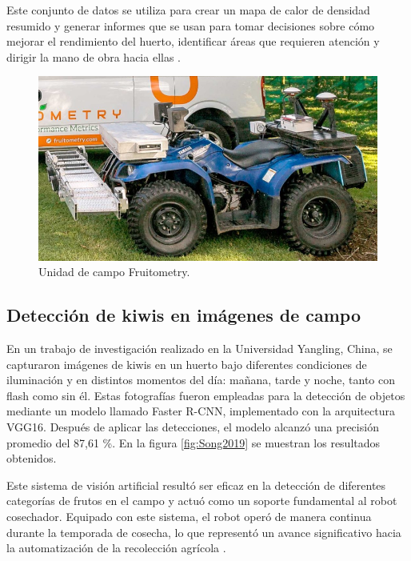 Este conjunto de datos se utiliza para crear un mapa de calor de densidad resumido y generar informes que se usan para tomar decisiones sobre cómo mejorar el rendimiento del huerto, identificar áreas que requieren atención y dirigir la mano de obra hacia ellas \citep{WEBSITE:Fruitometry2024}.

\vspace{1cm}
\begin{figure}[htbp]
	\centering
	\includegraphics[width=.5\textwidth]{./Figures/Fruitometry.png}
	\caption{Unidad de campo Fruitometry\protect\footnotemark.}
	\label{fig:Fruitometry}
\end{figure}
\vspace{1cm}


\subsection{Detección de kiwis en imágenes de campo}

En un trabajo de investigación realizado en la Universidad Yangling, China, se capturaron imágenes de kiwis en un huerto bajo diferentes condiciones de iluminación y en distintos momentos del día: mañana, tarde y noche, tanto con flash como sin él. Estas fotografías fueron empleadas para la detección de objetos mediante un modelo llamado Faster R-CNN, implementado con la arquitectura VGG16. Después de aplicar las detecciones, el modelo alcanzó una precisión promedio del 87,61 \%. En la figura \ref{fig:Song2019} se muestran los resultados obtenidos.

Este sistema de visión artificial resultó ser eficaz en la detección de diferentes categorías de frutos en el campo y actuó como un soporte fundamental al robot cosechador. Equipado con este sistema, el robot operó de manera continua durante la temporada de cosecha, lo que representó un avance significativo hacia la automatización de la recolección agrícola \citep{Song2019}.

\vspace{1cm}

